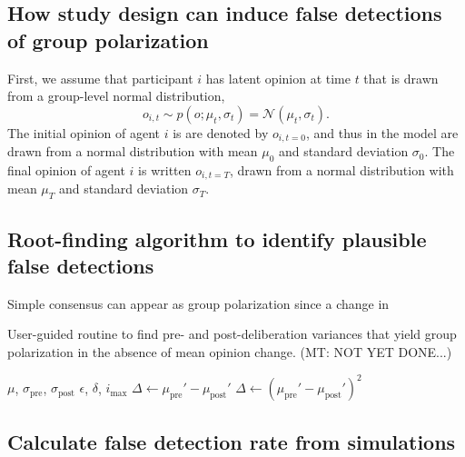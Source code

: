 \documentclass[
  abstract]{article}
\newcommand{\mupre}{\mu_\mathrm{pre}}
\newcommand{\mupost}{\mu_\mathrm{post}}
\newcommand{\sigmapre}{\sigma_\mathrm{pre}}
\newcommand{\sigmapost}{\sigma_\mathrm{post}}
\newcommand{\mt}[1]{{\textcolor{myorange} {({\tiny MT:} #1)}}}
\begin{document}
\subsection{How study design can induce false detections of group polarization}

First, we assume that participant $i$ has
latent opinion at time $t$ that is drawn from a group-level normal distribution,
\begin{equation}
  o_{i,t} \sim p(o; \mu_t, \sigma_t) = \mathcal{N}(\mu_t, \sigma_t).
  \label{eq:opinionDistribution}
\end{equation} 
\noindent 
The initial opinion of agent $i$ is are denoted by $o_{i,t=0}$, and thus
in the model are drawn from a normal distribution with mean $\mu_0$ and standard
deviation $\sigma_0$. The final opinion of agent $i$ is written $o_{i,t=T}$,
drawn from a normal distribution with mean $\mu_T$ and standard deviation
$\sigma_T$. 

\subsection{Root-finding algorithm to identify plausible false detections} 

Simple consensus can appear as group polarization since a change in 

\begin{algorithm}
  \caption{User-guided routine to find pre- and post-deliberation variances that
  yield group polarization in the absence of mean opinion change.
\mt{NOT YET DONE...}}\label{alg:routine}
  \begin{algorithmic}
    \Require $\mu$, $\sigmapre$, $\sigmapost$ 
    \Require $\epsilon$, $\delta$, $i_\mathrm{max}$ 
    \State $\Delta \gets \mupre' - \mupost'$ 
      \State $\Delta \gets (\mupre' - \mupost')^2$
    \EndWhile
  \end{algorithmic}
\end{algorithm}



\subsection{Calculate false detection rate from simulations}
\end{document}

